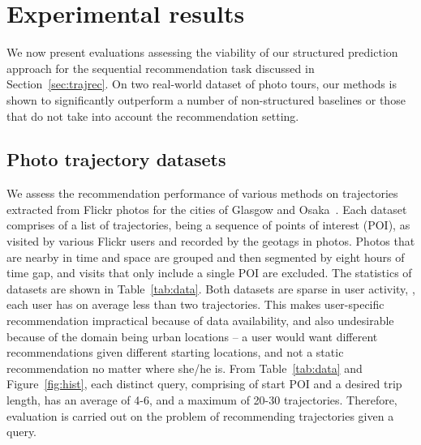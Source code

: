
\secmoveup
\section{Experimental results}
\label{sec:experiment}
\textmoveup

We now present evaluations assessing the viability of our structured prediction approach
for the sequential recommendation task discussed in Section~\ref{sec:trajrec}.
On two real-world dataset of photo tours, our methods is shown to significantly outperform
a number of non-structured baselines or those that do not take into account the recommendation setting.


\secmoveup
\subsection{Photo trajectory datasets}
\label{sec:dataset}
\textmoveup

We assess the recommendation performance %
of various methods
on trajectories extracted from Flickr photos
for the cities of Glasgow and Osaka~\cite{thomee2016yfcc100m,ijcai15}.
Each dataset comprises of a
list of trajectories, being a sequence of points of interest (POI), as visited by various Flickr users
and recorded by the geotags in photos. Photos that are nearby in time and space are grouped and then segmented by eight hours of time gap, and visits that only include a single POI are excluded.
The statistics of datasets are shown in Table~\ref{tab:data}.
Both datasets are sparse in user activity,
\ie, each user has on average less than two trajectories.
This makes user-specific recommendation impractical because of
data availability, and also undesirable because of the domain being urban locations
-- a user would want different recommendations given different starting locations, and not a static recommendation no matter where she/he is.
From Table~\ref{tab:data} and Figure~\ref{fig:hist},
each distinct query, comprising of start POI and a desired trip length,
has an average of 4-6, and a maximum of 20-30 trajectories.
Therefore, evaluation is carried out on the problem of recommending trajectories given a query.

